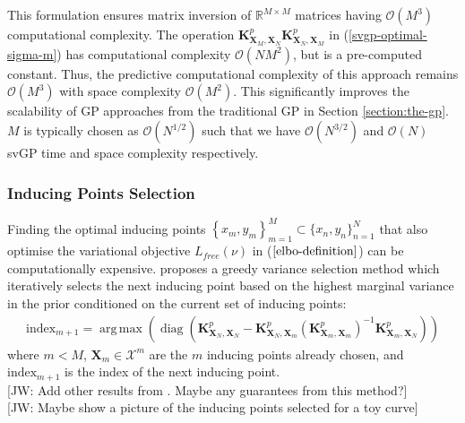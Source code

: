 \documentclass{article}
\newcommand{\jw}[1]{{\color{gray} [JW: #1]}}
\newcommand{\diag}{\operatorname{diag}}
\DeclareMathOperator*{\argmax}{arg\,max}
\numberwithin{equation}{section}
\begin{document}
This formulation ensures matrix inversion of $\mathbb{R}^{M \times M}$ matrices having $\mathcal{O}\left(M^3\right)$ computational complexity. The operation $\mathbf{K}^p_{\mathbf{X}_M, \mathbf{X}_N} \mathbf{K}^p_{\mathbf{X}_N, \mathbf{X}_M} $ in (\ref{svgp-optimal-sigma-m}) has computational complexity $\mathcal{O}\left(NM^2\right)$, but is a pre-computed constant. Thus, the predictive computational complexity of this approach remains $\mathcal{O}\left(M^3\right)$ with space complexity $\mathcal{O}\left(M^2\right)$. This significantly improves the scalability of GP approaches from the traditional GP in Section \ref{section:the-gp}. $M$ is typically chosen as $\mathcal{O}(N^{1/2})$ such that we have $\mathcal{O}(N^{3/2})$ and $\mathcal{O}(N)$ svGP time and space complexity respectively.

\subsubsection{Inducing Points Selection}
Finding the optimal inducing points $\left\{x_m, y_m\right\}_{m=1}^{M} \subset \{x_n, y_n\}_{n=1}^{N}$ that also optimise the variational objective $L_{free}(\nu)$ in ($\ref{elbo-definition}$) can be computationally expensive. \cite{burt2020convergence} proposes a greedy variance selection method which iteratively selects the next inducing point based on the highest marginal variance in the prior conditioned on the current set of inducing points:
\begin{align}
    \label{greedy-varaince-selection}
    \text{index}_{m+1} = \argmax \left(\diag \left(\mathbf{K}^p_{\mathbf{X}_N, \mathbf{X}_N} - \mathbf{K}^p_{\mathbf{X}_N, \mathbf{X}_{m}} \left(\mathbf{K}^p_{\mathbf{X}_{m}, \mathbf{X}_{m}}\right)^{-1}\mathbf{K}^p_{\mathbf{X}_{m}, \mathbf{X}_N}\right)\right)
\end{align}
where $m < M$, $\mathbf{X}_{m} \in \mathcal{X}^m$ are the $m$ inducing points already chosen, and $\text{index}_{m+1}$ is the index of the next inducing point.
\\\jw{Add other results from \cite{burt2020convergence}. Maybe any guarantees from this method?}
\\\jw{Maybe show a picture of the inducing points selected for a toy curve}
\end{document}
